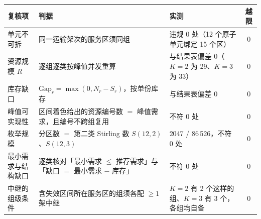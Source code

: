 \begin{center}
\begin{minipage}{\textwidth}
	\label{tab:q4check}
	\centering
	\begin{tabularx}{0.98\textwidth}{lXXc}
		\toprule
		复核项 & 判据 & 实测 & 越限 \\
		\midrule
		单元不可拆 & 同一运输架次的服务区须同组 & 违规 0 处（12 个原子单元绑定 15 个区） & 0 \\
		资源规模 $R$ & 逐组逐类按峰值并发重算 & 与结果表偏差 0（$K=2$ 为 29、$K=3$ 为 33） & 0 \\
		库存缺口 & $\mathrm{Gap}_r=\max(0,N_r-S_r)$，按单份库存 & 与结果表偏差 0 & 0 \\
		峰值可实现性 & 区间着色给出的资源编号数 $=$ 峰值需求，且编号不跨组复用 & 不符 0 处 & 0 \\
		枚举规模 & 分区数 $=$ 第二类 Stirling 数 $S(12,2)$、$S(12,3)$ & 2047 / 86\,526，不符 0 处 & 0 \\
		最小需求与结构缺口 & 逐类核对「最小需求 $\le$ 推荐需求」与「缺口 $=$ 最小需求 $-$ 库存」 & 不符 0 处 & 0 \\
		中继的组级条件 & 含失效区间所在服务区的组须各配 $\ge 1$ 架中继 & $K=2$ 有 2 个这样的组、$K=3$ 有 3 个，各组均自备 & 0 \\
		\bottomrule
	\end{tabularx}
\end{minipage}
\end{center}

